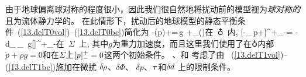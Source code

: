 由于地球偏离球对称的程度很小，因此我们很自然地将扰动前的模型视为{\em 球对称的\/}且为流体静力学的。
在此情形下，扰动后的地球模型的静态平衡条件~(\ref{13.delT0vol})--(\ref{13.delT0bc})简化为
\eq
\label{13.delT1vol}
-\bdel(\delta p)+\bdel\cdot\btau=\delta\hspace{-0.2 mm}\rho\,g\brh
+\rho\bdel_{\!}(\delta\Phi)\quad\mbox{在 $\earth$ 内},
\en
\eq
\label{13.delT1bc}
[-\brh_{\,}\delta p+\brh\cdot\btau]^+_-=
-\delta\hspace{-0.1 mm}d_{\,}\brh_{\,}
g[\hspace{0.1 mm}\rho\hspace{0.1 mm}]^+_-\quad\mbox{在 $\Sigma$ 上},
\en
其中$g$为重力加速度，而且这里我们使用了在$\earth$内部$\dot{p}+\rho g=0$和在$\Sigma$上$[\hspace{0.1 mm}p\hspace{0.1 mm}]^+_-=0$这两个初始条件。
\textcite{backus67}、\textcite{woodhouse&dahlen78}和 \textcite{wahr&devries89}考虑了由
~(\ref{13.delT1vol})--(\ref{13.delT1bc})施加在微扰
$\delta\hspace{-0.2 mm}\rho$、$\delta\Phi$、
$\delta p$、$\mbox{\boldmath $\bf \tau$}$和$\delta\hspace{-0.1 mm}d$
上的限制条件。

